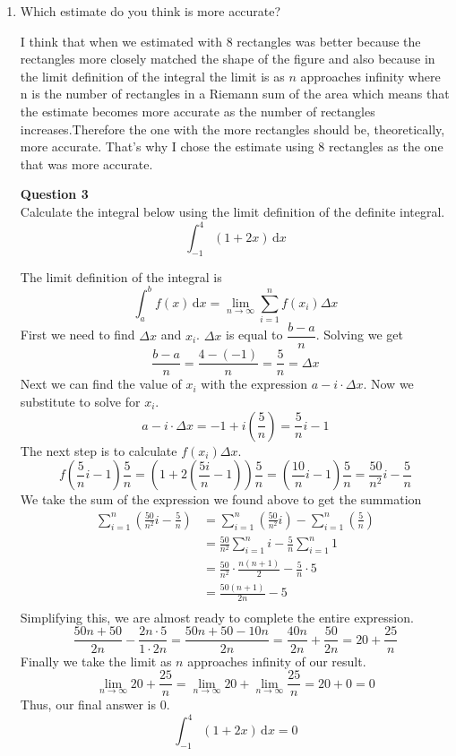 \documentclass{article}
\begin{document}
\begin{enumerate}[label=(\alph*)]
\item Which estimate do you think is more accurate?
\par
I think that when we estimated with 8 rectangles was better because the rectangles more closely matched the shape of the figure and also because in the limit definition of the integral the limit is as $n$ approaches infinity where n is the number of rectangles in a Riemann sum of the area which means that the estimate becomes more accurate as the number of rectangles increases.Therefore the one with the more rectangles should be, theoretically, more accurate. That's why I chose the estimate using 8 rectangles as the one that was more accurate.

\newpage

\begin{center}
\textbf{Question 3} \\
Calculate the integral below using the limit definition of the definite integral.
\[\int_{-1}^4 \! (1+2x) \, \text{d}x\]
\end{center}

The limit definition of the integral is
\[\int_a^b \!f(x) \, \text{d}x = \lim_{n \to \infty} {\sum_{i=1}^{n} f(x_i)\Delta x}\]
First we need to find $\Delta x$ and $x_i$. $\Delta x$ is equal to $\dfrac{b-a}{n}$. Solving we get
\[\frac{b-a}{n}=\frac{4-(-1)}{n}=\frac{5}{n}=\Delta x\]
Next we can find the value of $x_i$ with the expression $a-i\cdot\Delta x$. Now we substitute to solve for $x_i$.
\[a-i\cdot\Delta x=-1+i(\frac{5}{n})=\frac{5}{n}i-1\]
The next step is to calculate $f(x_i)\Delta x$.
\[f(\frac{5}{n}i-1)\frac{5}{n}=(1+2(\frac{5i}{n}-1))\frac{5}{n}=(\frac{10}{n}i-1)\frac{5}{n}=\frac{50}{n^2}i-\frac{5}{n}\]
We take the sum of the expression we found above to get the summation
\begin{align*}
\sum_{i=1}^n {\left(\frac{50}{n^2}i-\frac{5}{n}\right)}&=\sum_{i=1}^n {\left(\frac{50}{n^2}i\right)}-\sum_{i=1}^n {\left(\frac{5}{n}\right)} \\
&=\frac{50}{n^2}\sum_{i=1}^n {i} - \frac{5}{n}\sum_{i=1}^{n} {1} \\
&=\frac{50}{n^2}\cdot\frac{n(n+1)}{2}-\frac{5}{n}\cdot 5 \\
&=\frac{50(n+1)}{2n}-5 \\
\end{align*}
Simplifying this, we are almost ready to complete the entire expression.
\[\frac{50n+50}{2n}-\frac{2n\cdot5}{1\cdot2n}=\frac{50n+50-10n}{2n}=\frac{40n}{2n}+\frac{50}{2n}=20+\frac{25}{n}\]
Finally we take the limit as $n$ approaches infinity of our result.
\[\lim_{n \to \infty} {20 +\frac{25}{n}}=\lim_{n \to \infty} {20} + \lim_{n \to \infty} {\frac{25}{n}}= 20 + 0=0\]
Thus, our final answer is 0.
\[\int_{-1}^4 \! (1+2x) \, \text{d}x=0\]


\end{enumerate}
\end{document}
